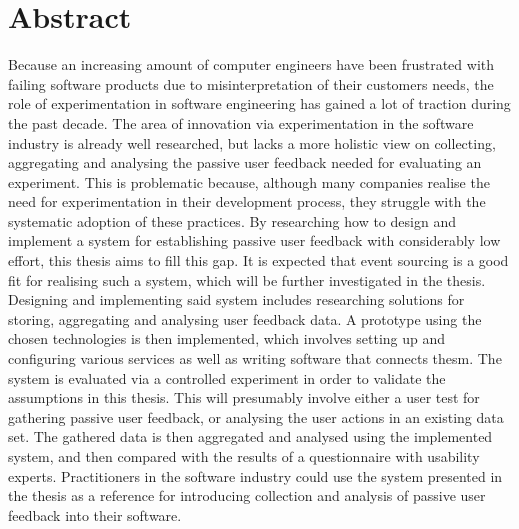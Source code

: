 %
\chapter*{Abstract}
\label{sec:abstract}
\vspace*{-10mm}

Because an increasing amount of computer engineers have been frustrated with failing software products due to misinterpretation of their customers needs, the role of experimentation in software engineering has gained a lot of traction during the past decade.
The area of innovation via experimentation in the software industry is already well researched, but lacks a more holistic view on collecting, aggregating and analysing the passive user feedback needed for evaluating an experiment.
This is problematic because, although many companies realise the need for experimentation in their development process, they struggle with the systematic adoption of these practices.
By researching how to design and implement a system for establishing passive user feedback with considerably low effort, this thesis aims to fill this gap.
It is expected that event sourcing is a good fit for realising such a system, which will be further investigated in the thesis.
Designing and implementing said system includes researching solutions for storing, aggregating and analysing user feedback data.
A prototype using the chosen technologies is then implemented, which involves setting up and configuring various services as well as writing software that connects thesm.
The system is evaluated via a controlled experiment in order to validate the assumptions in this thesis.
This will presumably involve either a user test for gathering passive user feedback, or analysing the user actions in an existing data set.
The gathered data is then aggregated and analysed using the implemented system, and then compared with the results of a questionnaire with usability experts.
Practitioners in the software industry could use the system presented in the thesis as a reference for introducing collection and analysis of passive user feedback into their software.
